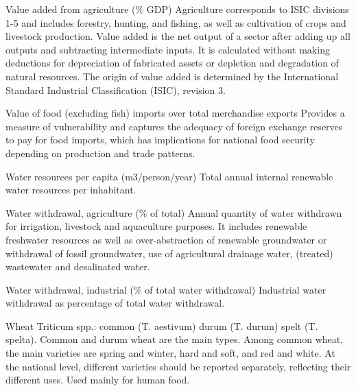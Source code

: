 \begin{MetadataCollection} {}
\begin{Energy consumption in agriculture, total} {}
\begin{metadata}{Value added from agriculture (\% GDP)} {}
Agriculture corresponds to ISIC divisions 1-5 and includes forestry, hunting, and fishing, as well as cultivation of crops and livestock production. Value added is the net output of a sector after adding up all outputs and subtracting intermediate inputs. It is calculated without making deductions for depreciation of fabricated assets or depletion and degradation of natural resources. The origin of value added is determined by the International Standard Industrial Classification (ISIC), revision 3.
\end{metadata}

\begin{metadata}{Value of food (excluding fish) imports over total merchandise exports} {}
Provides a measure of vulnerability and captures the adequacy of foreign exchange reserves to pay for food imports, which has implications for national food security depending on production and trade patterns.
\end{metadata}

\begin{metadata}{Water resources per capita (m3/person/year)} {}
Total annual internal renewable water resources per inhabitant.
\end{metadata}

\begin{metadata}{Water withdrawal, agriculture (\% of total)} {}
Annual quantity of water withdrawn for irrigation, livestock and aquaculture purposes. It includes renewable freshwater resources as well as over-abstraction of renewable groundwater or withdrawal of fossil groundwater, use of agricultural drainage water, (treated) wastewater and desalinated water.
\end{metadata}

\begin{metadata}{Water withdrawal, industrial (\% of total water withdrawal)} {}
Industrial water withdrawal as percentage of total water withdrawal.
\end{metadata}

\begin{metadata}{Wheat} {}
Triticum spp.: common (T. aestivum) durum (T. durum) spelt (T. spelta). Common and durum wheat are the main types. Among common wheat, the main varieties are spring and winter, hard and soft, and red and white. At the national level, different varieties should be reported separately, reflecting their different uses. Used mainly for human food.
\end{metadata}


\end{Energy consumption in agriculture, total}
\end{MetadataCollection}
